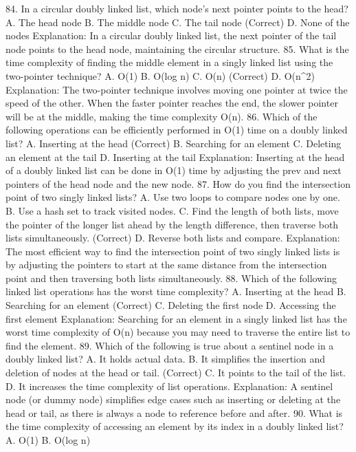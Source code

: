 84. In a circular doubly linked list, which node's next pointer points to the head?
A. The head node
B. The middle node
C. The tail node (Correct)
D. None of the nodes
Explanation: In a circular doubly linked list, the next pointer of the tail node points to the head node, maintaining the circular structure.
85. What is the time complexity of finding the middle element in a singly linked list using the two-pointer technique?
A. O(1)
B. O(log n)
C. O(n) (Correct)
D. O(n^2)
Explanation: The two-pointer technique involves moving one pointer at twice the speed of the other. When the faster pointer reaches the end, the slower pointer will be at the middle, making the time complexity O(n).
86. Which of the following operations can be efficiently performed in O(1) time on a doubly linked list?
A. Inserting at the head (Correct)
B. Searching for an element
C. Deleting an element at the tail
D. Inserting at the tail
Explanation: Inserting at the head of a doubly linked list can be done in O(1) time by adjusting the prev and next pointers of the head node and the new node.
87. How do you find the intersection point of two singly linked lists?
A. Use two loops to compare nodes one by one.
B. Use a hash set to track visited nodes.
C. Find the length of both lists, move the pointer of the longer list ahead by the length difference, then traverse both lists simultaneously. (Correct)
D. Reverse both lists and compare.
Explanation: The most efficient way to find the intersection point of two singly linked lists is by adjusting the pointers to start at the same distance from the intersection point and then traversing both lists simultaneously.
88. Which of the following linked list operations has the worst time complexity?
A. Inserting at the head
B. Searching for an element (Correct)
C. Deleting the first node
D. Accessing the first element
Explanation: Searching for an element in a singly linked list has the worst time complexity of O(n) because you may need to traverse the entire list to find the element.
89. Which of the following is true about a sentinel node in a doubly linked list?
A. It holds actual data.
B. It simplifies the insertion and deletion of nodes at the head or tail. (Correct)
C. It points to the tail of the list.
D. It increases the time complexity of list operations.
Explanation: A sentinel node (or dummy node) simplifies edge cases such as inserting or deleting at the head or tail, as there is always a node to reference before and after.
90. What is the time complexity of accessing an element by its index in a doubly linked list?
A. O(1)
B. O(log n)
